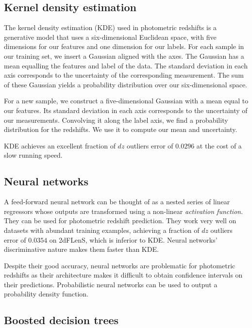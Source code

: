 \documentclass[11pt,twoside,openright]{report}
\begin{document}
\subsection{Kernel density estimation}

The kernel density estimation (KDE) used in photometric redshifts is a generative model that uses a six-dimensional Euclidean space, with five dimensions for our features and one dimension for our labels. For each sample in our training set, we insert a Gaussian aligned with the axes. The Gaussian has a mean equalling the features and label of the data. The standard deviation in each axis corresponds to the uncertainty of the corresponding measurement. The sum of these Gaussian yields a probability distribution over our six-dimensional space.

For a new sample, we construct a five-dimensional Gaussian with a mean equal to our features. Its standard deviation in each axis corresponds to the uncertainty of our measurements. Convolving it along the label axis, we find a probability distribution for the redshifts. We use it to compute our mean and uncertainty. \citep{Chris}

KDE achieves an excellent fraction of $dz$ outliers error of $0.0296$ at the cost of a slow running speed.

\subsection{Neural networks}

A feed-forward neural network can be thought of as a nested series of linear regressors whose outputs are transformed using a non-linear \emph{activation function}. \citep{Bishop} They can be used for photometric redshift prediction. \citep{ANNPhotoZ} They work very well on datasets with abundant training examples, achieving a fraction of $dz$ outliers error of $0.0354$ on 2dFLenS, which is inferior to KDE. \citep{Chris} Neural networks' discriminative nature makes them faster than KDE.

Despite their good accuracy, neural networks are problematic for photometric redshifts as their architecture makes it difficult to obtain confidence intervals on their predictions. Probabilistic neural networks \citep{PNNs} can be used to output a probability density function.

\subsection{Boosted decision trees}
\end{document}
